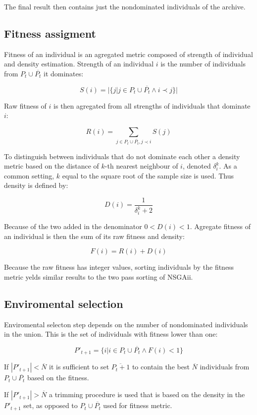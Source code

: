 \documentclass[12pt,oneside]{fithesis2}
\begin{document}
The final result then contains just the nondominated individuals of the archive.

\subsection{Fitness assigment}
	Fitness of an individual is an agregated metric composed of strength of individual and density estimation. Strength of an individual $i$ is the number of individuals from $P_t \cup \overline{P_t}$ it dominates:

$$ S(i) = |\{j| j \in P_t \cup \overline{P_t} \land i \prec j\}| $$

Raw fitness of $i$ is then agregated from all strengths of individuals that dominate $i$:

$$ R(i) = \sum\limits_{j \in P_t \cup \overline{P_t},j \prec i} S(j)$$

To distinguish between individuals that do not dominate each other a density metric based on the distance of $k$-th nearest neighbour of $i$, denoted $\delta^k_i$. As a common setting, $k$ equal to the square root of the sample size is used. Thus density is defined by:

$$D(i) = \frac{1}{\delta^k_i + 2} $$

Because of the two added in the denominator  $0 < D(i) < 1$. Agregate fitness of an individual is then the sum of its raw fitness and density:

$$F(i) = R(i) + D(i) $$

Because the raw fitness has integer values, sorting individuals by the fitness metric yelds similar results to the two pass sorting of NSGAii.

\subsection{Enviromental selection}
Enviromental selecton step depends on the number of nondominated individuals in the union. This is the set of individuals with fitness lower than one:

$$P'_{t+1} =\{i | i \in P_t \cup \overline{P_t} \land F(i)<1\}$$

If $|P'_{t+1}| < \overline N$ it is sufficient to set $\overline{P_t+1}$ to contain the best $\overline N$ individuals from $P_t \cup \overline{P_t}$ based on the fitness.

If $|P'_{t+1}| > \overline N$ a trimming procedure is used that is based on the density in the $P'_{t+1}$ set, as opposed to $P_t \cup \overline{P_t}$ used for fitness metric.
\end{document}
